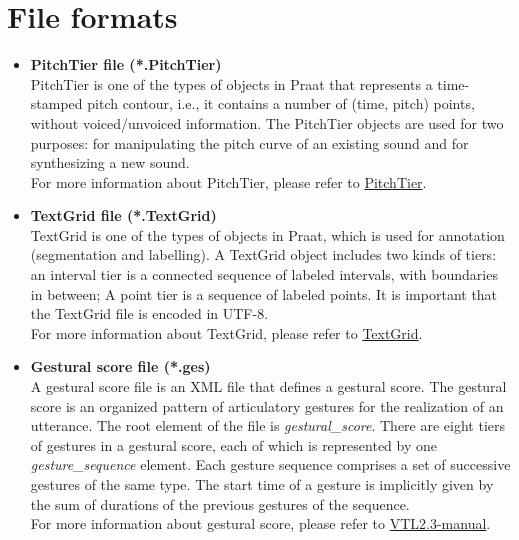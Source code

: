 \chapter{File formats}\label{ff}
\begin{itemize}
    \item \textbf{PitchTier file (*.PitchTier)}\\
    PitchTier is one of the types of objects in Praat that represents a time-stamped pitch contour, i.e., it contains a number of (time, pitch) points, without voiced/unvoiced information. The PitchTier objects are used for two purposes: for manipulating the pitch curve of an existing sound and for synthesizing a new sound.\\
    For more information about PitchTier, please refer to  \href{https://www.fon.hum.uva.nl/praat/manual/PitchTier.html}{PitchTier}.

    \item \textbf{TextGrid file (*.TextGrid)}\\
    TextGrid is one of the types of objects in Praat, which is used for annotation (segmentation and labelling). A TextGrid object includes two kinds of tiers: an interval tier is a connected sequence of labeled intervals, with boundaries in between; A point tier is a sequence of labeled points. It is important that the TextGrid file is encoded in UTF-8.\\
    For more information about TextGrid, please refer to  \href{https://www.fon.hum.uva.nl/praat/manual/TextGrid_file_formats.html}{TextGrid}.

    \item \textbf{Gestural score file (*.ges)}\\
    A gestural score file is an XML file that defines a gestural score. The gestural score is an organized pattern of articulatory gestures for the realization of an utterance. The root element of the file is \textsl{gestural\_score}. There are eight tiers of gestures in a gestural score, each of which is represented by one \textsl{gesture\_sequence} element. Each gesture sequence comprises a set of successive gestures of the same type. The start time of a gesture is implicitly given by the sum of durations of the previous gestures of the sequence.\\
    For more information about gestural score, please refer to  \href{https://www.vocaltractlab.de/download-vocaltractlab/VTL2.3-manual.pdf}{VTL2.3-manual}.
\end{itemize}